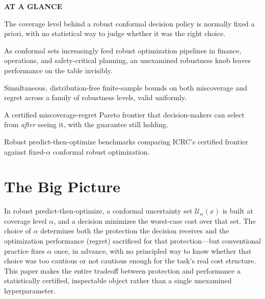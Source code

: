 \documentclass[10pt,twocolumn]{article}
\begin{document}
\begin{mdframed}[backgroundcolor=boxgray,linecolor=rulered,linewidth=1pt,
    innerleftmargin=6pt,innerrightmargin=6pt,
    innertopmargin=6pt,innerbottommargin=6pt]
\textbf{\small AT A GLANCE}\par\vspace{4pt}
\begin{description}[leftmargin=0pt,labelsep=4pt,itemsep=2pt,parsep=0pt,
    font=\small\bfseries]
  \item[Problem:] The coverage level behind a robust conformal decision
    policy is normally fixed a priori, with no statistical way to judge
    whether it was the right choice.
  \item[Why it matters:] As conformal sets increasingly feed robust
    optimization pipelines in finance, operations, and safety-critical
    planning, an unexamined robustness knob leaves performance on the
    table invisibly.
  \item[Method:] Simultaneous, distribution-free finite-sample bounds
    on both miscoverage and regret across a family of robustness
    levels, valid uniformly.
  \item[Result:] A certified miscoverage-regret Pareto frontier that
    decision-makers can select from \emph{after} seeing it, with the
    guarantee still holding.
  \item[Evidence:] Robust predict-then-optimize benchmarks comparing
    ICRC's certified frontier against fixed-$\alpha$ conformal robust
    optimization.
\end{description}
\end{mdframed}

\section{The Big Picture}

In robust predict-then-optimize, a conformal uncertainty set
$\mathcal{U}_\alpha(x)$ is built at coverage level $\alpha$, and a
decision minimizes the worst-case cost over that set. The choice of
$\alpha$ determines both the protection the decision receives and the
optimization performance (regret) sacrificed for that protection---but
conventional practice fixes $\alpha$ once, in advance, with no
principled way to know whether that choice was too cautious or not
cautious enough for the task's real cost structure. This paper makes
the entire tradeoff between protection and performance a statistically
certified, inspectable object rather than a single unexamined
hyperparameter.
\end{document}
